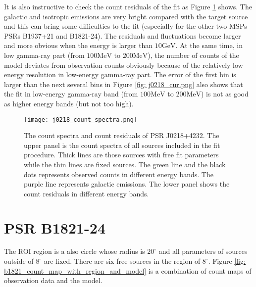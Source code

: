\documentclass[12pt]{report}
\begin{document}
      It is also instructive to check the count residuals of the fit as Figure 
      \ref{fig: j0218_count_spectra} shows. The galactic and isotropic emissions are very 
      bright compared with the target source and this can bring some difficulties to 
      the fit (especially for the other two MSPs PSRs B1937+21 and B1821-24). The residuals 
      and fluctuations become larger and more obvious when the energy is larger than 
      $10\mbox{GeV}$. At the same time, in low gamma-ray part 
      (from $100\mbox{MeV}$ to $200\mbox{MeV}$), the number of counts of the model 
      deviates from observation counts obviously because of the relatively low energy 
      resolution in low-energy gamma-ray part. The error of the first bin is larger
      than the next several bins in Figure \ref{fig: j0218_cur.png} also shows that 
      the fit in low-energy gamma-ray band (from $100\mbox{MeV}$ to $200\mbox{MeV}$) 
      is not as good as higher energy bands (but not too high). 
            
      \begin{figure}[!htp]
        \centering
        \texttt{[image: j0218\_count\_spectra.png]}
        \caption{The count spectra and count residuals of PSR J0218+4232.
                The upper panel is the count spectra of all sources included in the 
                fit procedure. Thick lines are those sources with free fit parameters 
                while the thin lines are fixed sources. The green line and the black 
                dots represents observed counts in different energy bands. The purple 
                line represents galactic emissions. The lower panel shows the count 
                residuals in different energy bands. } 
        \label{fig: j0218_count_spectra}
      \end{figure}

  \section{PSR B1821-24}
    The ROI region is a also circle whose radius is $20^\circ$ and all 
    parameters of sources outside of $8^\circ$ are fixed. 
    There are six free sources in the region of $8^\circ$. Figure
    \ref{fig: b1821_count_map_with_region_and_model} 
    is a combination of count maps of observation data and the model. 
\end{document}
